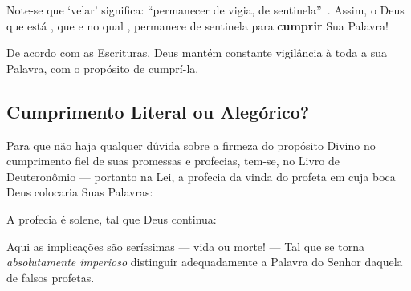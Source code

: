 
    Note-se que `velar' significa: ``permanecer de vigia, de sentinela''~\cite{2009-Houaiss+Franco-Objetiva}. Assim, o Deus  que
    está ,  que   e no qual , permanece de sentinela para \textbf{cumprir} Sua Palavra!

    \begin{DEF}
        \label{def.pri.vigilância}
        De acordo com as Escrituras, Deus mantém constante vigilância à toda a  sua  Palavra,  com  o  propósito  de
        cumprí-la.
    \end{DEF}


    \subsection{Cumprimento Literal ou Alegórico?}

    Para que não haja qualquer dúvida sobre a firmeza do propósito Divino no cumprimento fiel de  suas  promessas  e  profecias,
    tem-se, no Livro de Deuteronômio --- portanto na Lei, a profecia da vinda do  profeta  em  cuja  boca  Deus  colocaria  Suas
    Palavras:


    A profecia é solene, tal que Deus continua:


    Aqui as implicações são seríssimas --- vida ou morte!  ---  Tal  que  se  torna  \emph{absolutamente  imperioso}  distinguir
    adequadamente a Palavra do Senhor daquela de falsos profetas.

